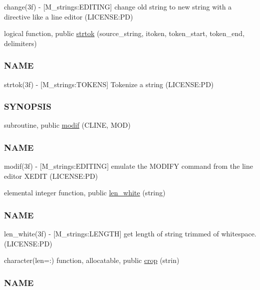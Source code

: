 \begin{DoxyCompactItemize}
\begin{DoxyCompactList}
change(3f) -\/ \mbox{[}M\+\_\+strings\+:E\+D\+I\+T\+I\+NG\mbox{]} change old string to new string with a directive like a line editor (L\+I\+C\+E\+N\+SE\+:PD) \end{DoxyCompactList}\item 
logical function, public \mbox{\hyperlink{namespacem__strings_aa53af9135873e241c487a75a7073bda1}{strtok}} (source\+\_\+string, itoken, token\+\_\+start, token\+\_\+end, delimiters)
\begin{DoxyCompactList}\small\item\em \subsubsection*{N\+A\+ME}

strtok(3f) -\/ \mbox{[}M\+\_\+strings\+:T\+O\+K\+E\+NS\mbox{]} Tokenize a string (L\+I\+C\+E\+N\+SE\+:PD) \subsubsection*{S\+Y\+N\+O\+P\+S\+IS}\end{DoxyCompactList}\item 
subroutine, public \mbox{\hyperlink{namespacem__strings_aec887410b018916a683fbb2ae529f8c5}{modif}} (C\+L\+I\+NE, M\+OD)
\begin{DoxyCompactList}\small\item\em \subsubsection*{N\+A\+ME}

modif(3f) -\/ \mbox{[}M\+\_\+strings\+:E\+D\+I\+T\+I\+NG\mbox{]} emulate the M\+O\+D\+I\+FY command from the line editor X\+E\+D\+IT (L\+I\+C\+E\+N\+SE\+:PD) \end{DoxyCompactList}\item 
elemental integer function, public \mbox{\hyperlink{namespacem__strings_aa1427d5dd673ff986236ba1732e693c1}{len\+\_\+white}} (string)
\begin{DoxyCompactList}\small\item\em \subsubsection*{N\+A\+ME}

len\+\_\+white(3f) -\/ \mbox{[}M\+\_\+strings\+:L\+E\+N\+G\+TH\mbox{]} get length of string trimmed of whitespace. (L\+I\+C\+E\+N\+SE\+:PD) \end{DoxyCompactList}\item 
character(len=\+:) function, allocatable, public \mbox{\hyperlink{namespacem__strings_a7030d33ae9e65d8cf2e2cb9332ffdac0}{crop}} (strin)
\begin{DoxyCompactList}\small\item\em \subsubsection*{N\+A\+ME}


\end{DoxyCompactList}
\end{DoxyCompactItemize}
